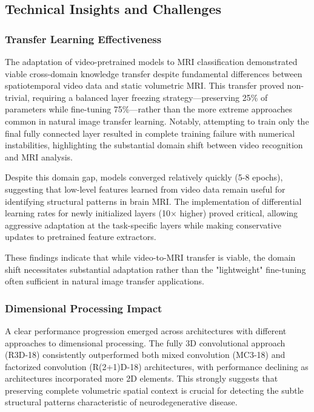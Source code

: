 \documentclass[12pt, a4paper]{article}
\begin{document}
\subsection{Technical Insights and Challenges}

\subsubsection{Transfer Learning Effectiveness}

The adaptation of video-pretrained models to MRI classification demonstrated viable cross-domain knowledge transfer despite fundamental differences between spatiotemporal video data and static volumetric MRI. This transfer proved non-trivial, requiring a balanced layer freezing strategy—preserving 25\% of parameters while fine-tuning 75\%—rather than the more extreme approaches common in natural image transfer learning. Notably, attempting to train only the final fully connected layer resulted in complete training failure with numerical instabilities, highlighting the substantial domain shift between video recognition and MRI analysis.

Despite this domain gap, models converged relatively quickly (5-8 epochs), suggesting that low-level features learned from video data remain useful for identifying structural patterns in brain MRI. The implementation of differential learning rates for newly initialized layers (10× higher) proved critical, allowing aggressive adaptation at the task-specific layers while making conservative updates to pretrained feature extractors.

These findings indicate that while video-to-MRI transfer is viable, the domain shift necessitates substantial adaptation rather than the "lightweight" fine-tuning often sufficient in natural image transfer applications.

\subsubsection{Dimensional Processing Impact}

A clear performance progression emerged across architectures with different approaches to dimensional processing. The fully 3D convolutional approach (R3D-18) consistently outperformed both mixed convolution (MC3-18) and factorized convolution (R(2+1)D-18) architectures, with performance declining as architectures incorporated more 2D elements. This strongly suggests that preserving complete volumetric spatial context is crucial for detecting the subtle structural patterns characteristic of neurodegenerative disease.
\end{document}
